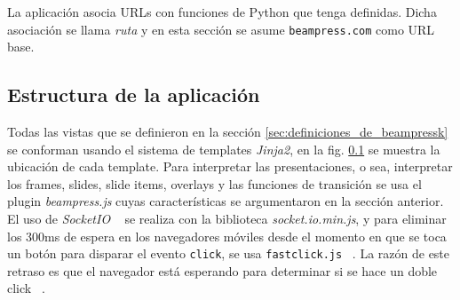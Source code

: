 		La aplicación asocia URLs con funciones de Python que tenga definidas. Dicha asociación se llama \textit{ruta} y en esta sección se asume \texttt{beampress.com} como URL base.
		
		\subsection{Estructura de la aplicación} %
		\label{sub:estructura_de_la_aplicacion}
			Todas las vistas que se definieron en la sección \ref{sec:definiciones_de_beampressk} se conforman usando el sistema de templates \textit{Jinja2}, en la fig. \ref{sub:estructura_de_la_aplicacion} se muestra la ubicación de cada template.
			Para interpretar las presentaciones, o sea, interpretar los frames, slides, slide items, overlays y las funciones de transición se usa el plugin \textit{beampress.js} cuyas características se argumentaron en la sección anterior. El uso de \textit{SocketIO} ~\cite{socketio} se realiza con la biblioteca \textit{socket.io.min.js}, y para eliminar los 300ms de espera en los navegadores móviles desde el momento en que se toca un botón para disparar el evento \texttt{click}, se usa \texttt{fastclick.js} ~\cite{fastclick}. La razón de este retraso es que el navegador está esperando para determinar si se hace un doble click ~\cite{fior}.
